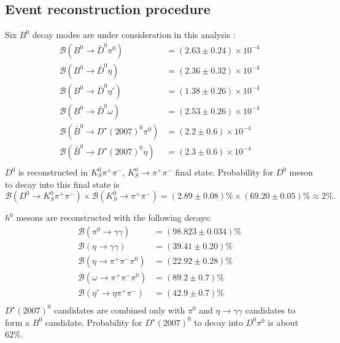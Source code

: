 \documentclass[preprint,aps,showpacs]{revtex4}
\newcommand{\dnkpp}{\ensuremath{D^0\to K^0_S\pi^+\pi^-}\xspace}
\newcommand{\dst}{\ensuremath{D^{\star}(2007)^0}\xspace}
\newcommand{\etagg}{\ensuremath{\eta\to\gamma\gamma}\xspace}
\begin{document}
\subsection{Event reconstruction procedure}
Six $B^0$ decay modes are under consideration in this analysis \cite{PDG}:
\begin{equation}\label{eq:signal-modes}
 \begin{split}
  \mathcal{B}(B^0\to\bar D^0\pi^0)      &= (2.63\pm0.24)\times 10^{-4}\\
  \mathcal{B}(B^0\to\bar D^0\eta)       &= (2.36\pm0.32)\times 10^{-4}\\
  \mathcal{B}(B^0\to\bar D^0\eta\prime) &= (1.38\pm0.26)\times 10^{-4}\\
  \mathcal{B}(B^0\to\bar D^0\omega)     &= (2.53\pm0.26)\times 10^{-4}\\
  \mathcal{B}(\bar B^0\to\dst\pi^0)      &= (2.2\pm0.6)\times 10^{-4}\\
  \mathcal{B}(\bar B^0\to\dst\eta)       &= (2.3\pm0.6)\times 10^{-4}\\
 \end{split}
\end{equation}
$D^0$ is reconstructed in $K_S^0\pi^+\pi^-$, $K_S^0\to\pi^+\pi^-$ final state. Probability for $D^0$ meson to decay into this final state is
\begin{equation}
 \mathcal{B}(\dnkpp)\times\mathcal{B}(K_S^0\to\pi^+\pi^-) = (2.89\pm0.08)\% \times (69.20\pm0.05)\% \approx 2\%.
\end{equation}

$h^0$ mesons are reconstructed with the following decays:
\begin{equation}\label{eq:h0-modes}
\begin{split}
 \mathcal{B}(\pi^0\to\gamma\gamma)        &= (98.823 \pm 0.034)\%\\
 \mathcal{B}(\eta\to\gamma\gamma)         &= (39.41  \pm 0.20)\%\\
 \mathcal{B}(\eta\to\pi^+\pi^-\pi^0)      &= (22.92  \pm 0.28)\%\\
 \mathcal{B}(\omega\to\pi^+\pi^-\pi^0)    &= (89.2   \pm 0.7)\%\\
 \mathcal{B}(\eta\prime\to\eta\pi^+\pi^-) &= (42.9   \pm 0.7)\%\\
\end{split}
\end{equation}
\dst candidates are combined only with $\pi^0$ and \etagg candidates to form a $B^0$ candidate. Probability for \dst to decay into $D^0\pi^0$ is about $62\%$.
\end{document}
